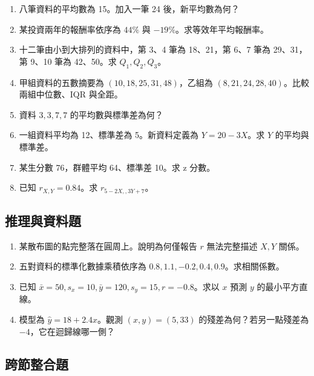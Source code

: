 \documentclass[11pt,a4paper]{article}
\providecommand{\tightlist}{%
  \setlength{\itemsep}{0pt}\setlength{\parskip}{0pt}}
\begin{document}
\begin{enumerate}
\def\labelenumi{\arabic{enumi}.}
\tightlist
\item
  八筆資料的平均數為 15。加入一筆 24 後，新平均數為何？
\item
  某投資兩年的報酬率依序為 \(44\%\) 與 \(-19\%\)。求等效年平均報酬率。
\item
  十二筆由小到大排列的資料中，第 3、4 筆為 18、21，第 6、7 筆為 29、31，第 9、10 筆為 42、50。求 \(Q_1,Q_2,Q_3\)。
\item
  甲組資料的五數摘要為 \((10,18,25,31,48)\)，乙組為 \((8,21,24,28,40)\)。比較兩組中位數、IQR 與全距。
\item
  資料 \(3,3,7,7\) 的平均數與標準差為何？
\item
  一組資料平均為 12、標準差為 5。新資料定義為 \(Y=20-3X\)。求 \(Y\) 的平均與標準差。
\item
  某生分數 76，群體平均 64、標準差 10。求 z 分數。
\item
  已知 \(r_{X,Y}=0.84\)。求 \(r_{5-2X,,3Y+7}\)。
\end{enumerate}

\subsection{推理與資料題}\label{ux63a8ux7406ux8207ux8cc7ux6599ux984c}

\begin{enumerate}
\def\labelenumi{\arabic{enumi}.}
\setcounter{enumi}{8}
\tightlist
\item
  某散布圖的點完整落在圓周上。說明為何僅報告 \(r\) 無法完整描述 \(X,Y\) 關係。
\item
  五對資料的標準化數據乘積依序為 \(0.8,1.1,-0.2,0.4,0.9\)。求相關係數。
\item
  已知 \(\bar x=50,s_x=10,\bar y=120,s_y=15,r=-0.8\)。求以 \(x\) 預測 \(y\) 的最小平方直線。
\item
  模型為 \(\hat y=18+2.4x\)。觀測 \((x,y)=(5,33)\) 的殘差為何？若另一點殘差為 \(-4\)，它在迴歸線哪一側？
\end{enumerate}

\subsection{跨節整合題}\label{ux8de8ux7bc0ux6574ux5408ux984c}
\end{document}
